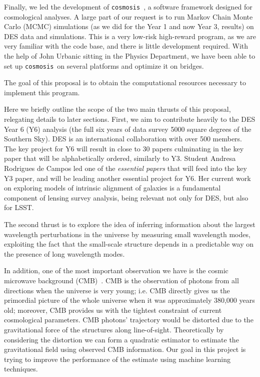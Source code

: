 \documentclass[12pt]{article}
\begin{document}
\begin{small}
\newcommand\cosmosis{{\tt cosmosis}}

Finally, we led the development of {\tt cosmosis}~\cite{Zuntz:2014csq}, a software framework designed for cosmological analyses. A large part of our request is to run Markov Chain Monte Carlo (MCMC) simulations (as we did for the Year 1 and now Year 3, results) on DES data and simulations. This is a very low-risk high-reward program, as we are very familiar with the code base, and there is little development required. With the help of John Urbanic sitting in the Physics Department, we have been able to set up \cosmosis\ on several platforms and optimize it on bridges.

The goal of this proposal is to obtain the computational resources necessary to implement this program.

Here we briefly outline the scope of the two main thrusts of this proposal, relegating details to later sections. First, we aim to contribute heavily to the DES Year 6 (Y6) analysis (the full six years of data survey 5000 square degrees of the Southern Sky). DES is an international collaboration with over 500 members. The key project for Y6 will result in close to 30 papers culminating in the key paper that will be alphabetically ordered, similarly to Y3. 
Student Andresa Rodrigues de Campos led one of the {\it essential papers} \cite{y3-tensions} that will feed into the key Y3 paper, and will be leading another essential project for Y6. Her current work on exploring models of intrinsic alignment of galaxies is a fundamental component of lensing survey analysis, being relevant not only for DES, but also for LSST.

The second thrust is to explore the idea of inferring information about the largest wavelength perturbations in the universe by measuring small wavelength modes, exploiting the fact that the small-scale structure depends in a predictable way on the presence of long wavelength modes.


In addition, one of the most important observation we have is the cosmic microwave background (CMB)~\cite{Dodelson:2003ft}. CMB is the observation of photons from all directions when the universe is very young; i.e. CMB directly gives us the primordial picture of the whole universe when it was approximately 380,000 years old; moreover, CMB provides us with the tightest constraint of current cosmological parameters. CMB photons' trajectory would be distorted due to the gravitational force of the structures along line-of-sight. Theoretically by considering the distortion we can form a quadratic estimator to estimate the gravitational field using observed CMB information. Our goal in this project is trying to improve the performance of the estimate using machine learning techniques.


\end{small}
\end{document}
